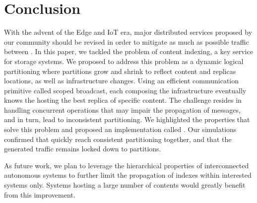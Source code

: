 \section{Conclusion}
\label{sec:conclusion}

With the advent of the Edge and IoT era, major distributed services
proposed by our community should be revised in order to mitigate as
much as possible traffic between \processes.  In this paper, we
tackled the problem of content indexing, a key service for storage
systems.
%
We proposed to address this problem as a dynamic logical partitioning
where partitions grow and shrink to reflect content and replicas
locations, as well as infrastructure changes. Using an efficient
communication primitive called scoped broadcast, each \process
composing the infrastructure eventually knows the \process hosting the
best replica of specific content.  The challenge resides in handling
concurrent operations that may impair the propagation of messages, and
in turn, lead to inconsistent partitioning.
%
We highlighted the properties that solve this problem and proposed an
implementation called \NAME.  Our simulations confirmed that
\processes quickly reach consistent partitioning together, and that
the generated traffic remains locked down to partitions.

As future work, we plan to leverage the hierarchical properties of
interconnected autonomous systems to further limit the propagation of
indexes within interested systems only. Systems hosting a large number
of contents would greatly benefit from this improvement.


%
%
%

